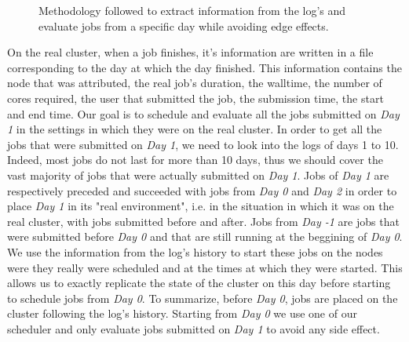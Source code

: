 \documentclass[conference,10pt]{IEEEtran}
\begin{document}
\begin{figure}[tb]
{
}
\caption{Methodology followed to extract information from the log's and evaluate jobs from a specific day while avoiding edge effects.}\label{fig.workload}
\label{fig.ex}
\end{figure}

On the real cluster, when a job finishes, it's information
are written in a file corresponding to the day at which the day finished.
This information contains the node that was attributed, the real job's duration, the walltime, 
the number of cores required, the user that submitted the job, the submission time, 
the start and end time.
Our goal is to schedule and evaluate all the jobs submitted on 
\textit{Day 1} in the settings in which they were on the real cluster.
In order to get all the jobs that were submitted on \textit{Day 1}, we need to
look into the logs of days 1 to 10. Indeed, most jobs do not last for more than 10 days,
thus we should cover the vast majority of jobs that were actually submitted on 
\textit{Day 1}. 
Jobs of \textit{Day 1} are respectively preceded and succeeded with jobs from \textit{Day 0}
and \textit{Day 2} in order to place \textit{Day 1} in its "real environment",
i.e. in the situation in which it was on the real cluster, with jobs submitted
before and after.
Jobs from \textit{Day -1} are jobs that were submitted before \textit{Day 0} and that are still running at the beggining of \textit{Day 0}.
We use the information from the log's history to start these jobs on the nodes
were they really were scheduled and at the times at which they were started.
This allows us to exactly replicate the state of the cluster on this day before starting
to schedule jobs from \textit{Day 0}.
To summarize, before \textit{Day 0}, jobs are placed on the cluster
following the log's history. Starting from \textit{Day 0} we 
use one of our scheduler and only evaluate jobs submitted on \textit{Day 1}
to avoid any side effect.
\end{document}
